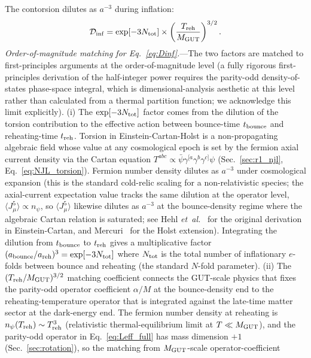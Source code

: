 \documentclass[aps,prd,twocolumn,superscriptaddress,showpacs,preprintnumbers,nofootinbib,longbibliography,floatfix]{revtex4-2}
\newcommand{\Dinf}{\mathcal{D}_{\rm inf}}
\newcommand{\etal}{\textit{et~al.}}
\begin{document}
The contorsion dilutes as $a^{-3}$ during inflation:
\begin{equation}\label{eq:Dinf}
\Dinf = \exp[-3N_{\rm tot}] \times \left(\frac{T_{\rm reh}}{M_{\rm GUT}}\right)^{3/2}.
\end{equation}
\textit{Order-of-magnitude matching for Eq.~\eqref{eq:Dinf}.}---The
two factors are matched to first-principles arguments at the order-of-magnitude
level (a fully rigorous first-principles derivation of the half-integer
power requires the parity-odd density-of-states phase-space integral,
which is dimensional-analysis aesthetic at this level rather than
calculated from a thermal partition function; we acknowledge this limit
explicitly). (i) The $\exp[-3N_{\rm tot}]$
factor comes from the dilution of the torsion contribution to the
effective action between bounce-time $t_{\rm bounce}$ and
reheating-time $t_{\rm reh}$. Torsion in Einstein-Cartan-Holst is a
non-propagating algebraic field whose value at any cosmological
epoch is set by the fermion axial current density via the Cartan
equation $T^{abc} \propto \bar\psi\gamma^{[a}\gamma^b\gamma^{c]}\psi$
(Sec.~\ref{sec:r1_njl}, Eq.~\ref{eq:NJL_torsion}). Fermion number
density dilutes as $a^{-3}$ under cosmological expansion (this is the
standard cold-relic scaling for a non-relativistic species; the
axial-current expectation value tracks the same dilution at the
operator level, $\langle J^5_\mu\rangle \propto n_\psi$, so
$\langle J^5_\mu\rangle$ likewise dilutes as $a^{-3}$ at the bounce-density
regime where the algebraic Cartan relation is saturated;
see Hehl \etal~\cite{Hehl1976} for the original
derivation in Einstein-Cartan, and Mercuri~\cite{Mercuri2009} for
the Holst extension). Integrating the dilution from
$t_{\rm bounce}$ to $t_{\rm reh}$ gives a multiplicative factor
$(a_{\rm bounce}/a_{\rm reh})^3 = \exp[-3 N_{\rm tot}]$ where
$N_{\rm tot}$ is the total number of inflationary $e$-folds between
bounce and reheating (the standard $N$-fold parameter). (ii) The
$(T_{\rm reh}/M_{\rm GUT})^{3/2}$ matching coefficient connects the
GUT-scale physics that fixes the parity-odd operator coefficient
$\alpha/M$ at the bounce-density end to the reheating-temperature
operator that is integrated against the late-time matter sector at
the dark-energy end. The fermion number density at reheating is
$n_\psi(T_{\rm reh}) \sim T_{\rm reh}^3$ (relativistic thermal-equilibrium limit at
$T \ll M_{\rm GUT}$), and the parity-odd operator in
Eq.~\eqref{eq:Leff_full} has mass dimension $+1$ (Sec.~\ref{sec:rotation}),
so the matching from $M_{\rm GUT}$-scale operator-coefficient
\end{document}
